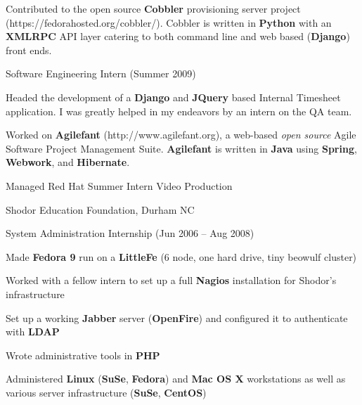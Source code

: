 \documentclass[11pt]{article}
\begin{document}
\begin{itemz}
\begin{itemz}[-]
\begin{itemz}[*]
                            \item Contributed to the open source {\bf Cobbler} provisioning server project \\
                            (https://fedorahosted.org/cobbler/).  Cobbler is written in {\bf Python} with an {\bf XMLRPC} API layer catering to both command line and web based ({\bf Django}) front ends.
                        \end{itemz}
                    \item Software Engineering Intern (Summer 2009)
                        \begin{itemz}[*]
                            \item Headed the development of a {\bf Django} and {\bf JQuery} based Internal Timesheet application.  I was greatly helped in my endeavors by an intern on the QA team.
                            \item Worked on {\bf Agilefant} (http://www.agilefant.org), a web-based \emph{open source} Agile Software Project Management Suite. {\bf Agilefant} is written in {\bf Java} using {\bf Spring}, {\bf Webwork}, and {\bf Hibernate}.
                            \item Managed Red Hat Summer Intern Video Production
                        \end{itemz}
                \end{itemz}
            \item Shodor Education Foundation, Durham NC
                \begin{itemz}[-]
                    \item System Administration Internship (Jun 2006 -- Aug 2008)
                        \begin{itemz}[*]
                            \item Made {\bf Fedora 9} run on a {\bf LittleFe} (6 node, one hard drive, tiny beowulf cluster)
                            \item Worked with a fellow intern to set up a full {\bf  Nagios} installation for Shodor's infrastructure
                            \item Set up a working {\bf Jabber} server ({\bf OpenFire}) and configured it to authenticate with {\bf LDAP}
                            \item Wrote administrative tools in {\bf PHP}
                            \item Administered {\bf Linux} ({\bf SuSe}, {\bf Fedora}) and {\bf Mac OS X} workstations as well as various server infrastructure ({\bf SuSe}, {\bf CentOS})

\end{itemz}
\end{itemz}
\end{itemz}
\end{document}
